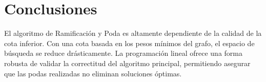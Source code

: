 \documentclass[a4paper,11pt]{article}
\begin{document}
\section{Conclusiones}
El algoritmo de Ramificación y Poda es altamente dependiente de la calidad de la cota inferior. Con una cota basada en los pesos mínimos del grafo, el espacio de búsqueda se reduce drásticamente. La programación lineal ofrece una forma robusta de validar la correctitud del algoritmo principal, permitiendo asegurar que las podas realizadas no eliminan soluciones óptimas.
\end{document}
